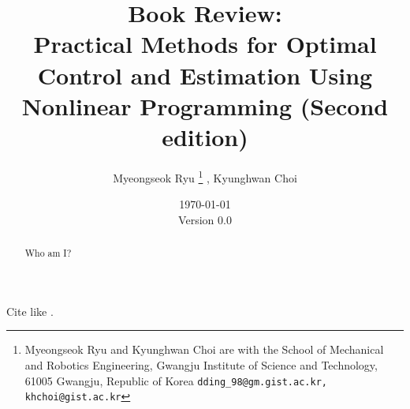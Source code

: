 \documentclass{article}
\title{
    Book Review:
    \\
    Practical Methods for Optimal Control and Estimation Using Nonlinear Programming (Second edition)
    }
\author{
    Myeongseok Ryu
    \thanks{Myeongseok Ryu and Kyunghwan Choi are with the School of Mechanical and Robotics Engineering, Gwangju Institute of Science and Technology, 61005 Gwangju, Republic of Korea {\tt\small dding\_98@gm.gist.ac.kr, khchoi@gist.ac.kr}}%
    ,
    Kyunghwan Choi
    \footnotemark[1]
}
\date{
    \today
    \\
    Version 0.0
}
\newcommand*{\template}{template}
\begin{document}
\maketitle

\begin{abstract}
    Who am I?
\end{abstract}

\tableofcontents



Cite like \cite{Khalil:2002aa}.





\begin{appendices}

\end{appendices}



\end{document}
